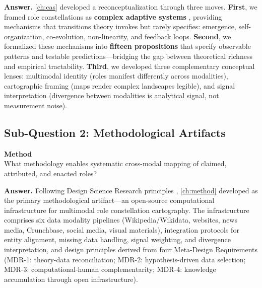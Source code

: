 \documentclass[../main.tex]{subfiles}
\begin{document}
\noindent\textbf{Answer.} \cref{ch:cas} developed a reconceptualization through three moves. \textbf{First}, we framed role constellations as \textbf{complex adaptive systems} \cite{levin1998ecosystems,sterman2000business}, providing mechanisms that transitions theory invokes but rarely specifies: emergence, self-organization, co-evolution, non-linearity, and feedback loops. \textbf{Second}, we formalized these mechanisms into \textbf{fifteen propositions} that specify observable patterns and testable predictions---bridging the gap between theoretical richness and empirical tractability. \textbf{Third}, we developed three complementary conceptual lenses: multimodal identity (roles manifest differently across modalities), cartographic framing (maps render complex landscapes legible), and signal interpretation (divergence between modalities is analytical signal, not measurement noise).

\subsection{Sub-Question 2: Methodological Artifacts}

\begin{subrq}
\textbf{Method}\\
What methodology enables systematic cross-modal mapping of claimed, attributed, and enacted roles?
\end{subrq}

\noindent\textbf{Answer.} Following Design Science Research principles , \cref{ch:method} developed \RoleBox{} as the primary methodological artifact---an open-source computational infrastructure for multimodal role constellation cartography. The infrastructure comprises six data modality pipelines (Wikipedia/Wikidata, websites, news media, Crunchbase, social media, visual materials), integration protocols for entity alignment, missing data handling, signal weighting, and divergence interpretation, and design principles derived from four Meta-Design Requirements (MDR-1: theory-data reconciliation; MDR-2: hypothesis-driven data selection; MDR-3: computational-human complementarity; MDR-4: knowledge accumulation through open infrastructure).
\end{document}
